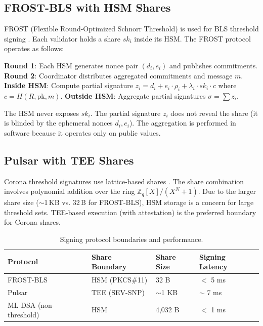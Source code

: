 \documentclass[11pt]{article}
\begin{document}
\subsection{FROST-BLS with HSM Shares}

FROST (Flexible Round-Optimized Schnorr Threshold) is used for BLS threshold signing \cite{threshold-mpc}. Each validator holds a share $sk_i$ inside its HSM. The FROST protocol operates as follows:

\begin{algorithmic}[1]
\State \textbf{Round 1}: Each HSM generates nonce pair $(d_i, e_i)$ and publishes commitments.
\State \textbf{Round 2}: Coordinator distributes aggregated commitments and message $m$.
\State \textbf{Inside HSM}: Compute partial signature $z_i = d_i + e_i \cdot \rho_i + \lambda_i \cdot sk_i \cdot c$ where $c = H(R, \text{pk}, m)$.
\State \textbf{Outside HSM}: Aggregate partial signatures $\sigma = \sum z_i$.
\end{algorithmic}

The HSM never exposes $sk_i$. The partial signature $z_i$ does not reveal the share (it is blinded by the ephemeral nonces $d_i, e_i$). The aggregation is performed in software because it operates only on public values.

\subsection{Pulsar with TEE Shares}

Corona threshold signatures use lattice-based shares \cite{corona}. The share combination involves polynomial addition over the ring $\mathbb{Z}_q[X]/(X^N+1)$. Due to the larger share size ($\sim$1\,KB vs. 32\,B for FROST-BLS), HSM storage is a concern for large threshold sets. TEE-based execution (with attestation) is the preferred boundary for Corona shares.

\begin{table}[h]
\centering
\begin{tabular}{@{}llll@{}}
\toprule
\textbf{Protocol} & \textbf{Share Boundary} & \textbf{Share Size} & \textbf{Signing Latency} \\
\midrule
FROST-BLS & HSM (PKCS\#11) & 32 B & $<$ 5 ms \\
Pulsar & TEE (SEV-SNP) & $\sim$1 KB & $\sim$ 7 ms \\
ML-DSA (non-threshold) & HSM & 4,032 B & $<$ 1 ms \\
\bottomrule
\end{tabular}
\caption{Signing protocol boundaries and performance.}
\label{tab:threshold-hsm}
\end{table}
\end{document}
